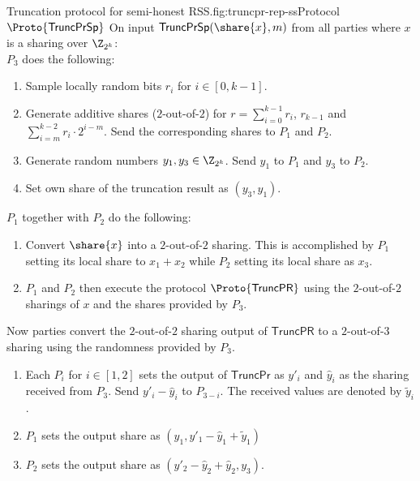 \begin{Boxfig}{Truncation protocol for semi-honest
RSS.}{fig:truncpr-rep-ss}{Protocol $\Proto{\mathsf{TruncPrSp}}$}
On input
$\mathsf{TruncPrSp}(\share{x}, m)$ from all parties where $x$ is a sharing
over $\Z_{2^k}$: \\
$P_3$ does the following:
  \begin{enumerate}
    \item Sample locally random bits $r_i$ for $i \in [0, k-1]$.
    \item Generate additive shares ($2$-out-of-$2$) for $r = \sum_{i=0}^{k-1}r_i$,
    $r_{k-1}$ and $\sum_{i=m}^{k-2} r_i \cdot 2^{i-m}$. Send the corresponding shares
    to $P_1$ and $P_2$.
    \item Generate random numbers $y_1, y_3 \in \Z_{2^k}$. Send $y_1$ to
    $P_1$ and $y_3$ to $P_2$.
    \item Set own share of the truncation result as $(y_3, y_1)$.
 \end{enumerate}
$P_1$ together with $P_2$ do the following:

\begin{enumerate}
   \item Convert $\share{x}$ into a $2$-out-of-$2$ sharing. This is
   accomplished by $P_1$ setting its local share to $x_1 + x_2$ while $P_2$
   setting its local share as $x_3$.
   \item $P_1$ and $P_2$ then execute the protocol $\Proto{\mathsf{TruncPR}}$
   using the $2$-out-of-$2$ sharings of $x$ and the shares provided by $P_3$.
\end{enumerate}
 Now parties convert the $2$-out-of-$2$ sharing output of
 $\mathsf{TruncPR}$ to a $2$-out-of-$3$
 sharing using the randomness provided by $P_3$.
 \begin{enumerate}
   \item Each $P_i$ for $i \in [1, 2]$ sets the output of $\mathsf{TruncPr}$
   as $y'_i$ and $\hat{y}_i$ as the sharing received from $P_3$. Send $y'_i -
   \hat{y}_i$ to $P_{3-i}$. The received values are denoted by $\tilde{y}_i$.
   \item $P_1$ sets the output share as $(y_1, y'_1 - \hat{y}_1 + \tilde{y}_1)$
   \item $P_2$ sets the output share as $(y'_2 - \hat{y}_2 + \widehat{y}_2, y_3)$.
 \end{enumerate}
\end{Boxfig}

